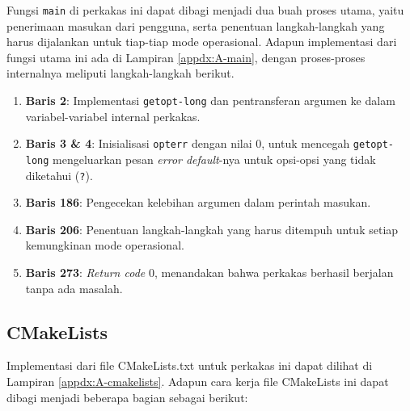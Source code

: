 Fungsi \verb|main| di perkakas ini dapat dibagi menjadi dua buah proses utama, yaitu penerimaan masukan dari pengguna, serta penentuan langkah-langkah yang harus dijalankan untuk tiap-tiap mode operasional. Adapun implementasi dari fungsi utama ini ada di Lampiran \ref{appdx:A-main}, dengan proses-proses internalnya meliputi langkah-langkah berikut.

\begin{enumerate}
	\item \textbf{Baris 2}: Implementasi \verb|getopt-long| dan pentransferan argumen ke dalam variabel-variabel internal perkakas.
	\item \textbf{Baris 3 \& 4}: Inisialisasi \verb|opterr| dengan nilai 0, untuk mencegah \verb|getopt-long| mengeluarkan pesan \textit{error default}-nya untuk opsi-opsi yang tidak diketahui (\textquotesingle\verb|?|\textquotesingle). 
	\item \textbf{Baris 186}: Pengecekan kelebihan argumen dalam perintah masukan.
	\item \textbf{Baris 206}: Penentuan langkah-langkah yang harus ditempuh untuk setiap kemungkinan mode operasional.
	\item \textbf{Baris 273}: \textit{Return code} 0, menandakan bahwa perkakas berhasil berjalan tanpa ada masalah.
\end{enumerate}
\vspace*{-0.5em} %
\subsection{CMakeLists}
\label{sec:testing-implementation-cmakelists}

Implementasi dari file CMakeLists.txt untuk perkakas ini dapat dilihat di Lampiran \ref{appdx:A-cmakelists}. Adapun cara kerja file CMakeLists ini dapat dibagi menjadi beberapa bagian sebagai berikut:

